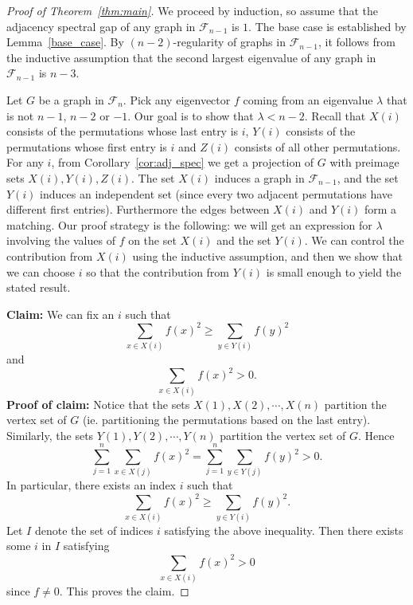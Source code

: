 \begin{proof}[Proof of Theorem~\ref{thm:main}]
  We proceed by induction,
  so assume that the adjacency spectral gap of any graph in $\mathcal{F}_{n-1}$ is $1$.  
  The base case is established by Lemma~\ref{base_case}.  By $(n-2)$-regularity of graphs
  in $\mathcal{F}_{n-1}$, it follows from the inductive assumption that the second largest
  eigenvalue of any graph in $\mathcal{F}_{n-1}$ is $n-3$.


  Let $G$ be a graph in $\mathcal{F}_{n}$.
  Pick any eigenvector $f$ coming from an eigenvalue $\lambda$ that is not
  $n-1$, $n-2$ or $-1$.  Our goal is to show that $\lambda < n-2$.
  Recall that $X(i)$ consists of the permutations whose 
  last entry is $i$, $Y(i)$ consists of the permutations whose first entry is
  $i$ and $Z(i)$ consists of all other permutations.  For any $i$, from 
  Corollary~\ref{cor:adj_spec}
  we get a projection of $G$ with preimage sets 
  $X(i), Y(i), Z(i)$.
  The set $X(i)$ induces a graph in $\mathcal{F}_{n-1}$, and the set $Y(i)$
  induces an independent set (since every two adjacent permutations have
  different first entries).
  Furthermore the edges between $X(i)$ and 
  $Y(i)$ form a matching.  Our proof strategy is the following:  we will
  get an expression for $\lambda$ involving the values of $f$ on the 
  set $X(i)$ and the set $Y(i)$.  We can control the contribution from 
  $X(i)$ using the inductive assumption, and then we show that we can
  choose $i$ so that the contribution from $Y(i)$ is small enough
  to yield the stated result.
  
  
  \vspace*{1mm}
  \noindent \textbf{Claim:} We can fix an $i$ such that 
   \begin{equation}\label{eqn:gap_max}
     \sum_{x \in X(i)} f(x)^2 \geq \sum_{y \in Y(i)} f(y)^2
   \end{equation}
   and 
   \[ \sum_{x \in X(i)} f(x)^2 > 0. \]
   \textbf{Proof of claim:} Notice that the sets $X(1), X(2), \cdots, X(n)$
  partition the vertex set of $G$ (ie.  partitioning the permutations
  based on the last entry).  Similarly, the sets 
  $Y(1), Y(2), \cdots, Y(n)$ partition the vertex set of $G$.
  Hence
   \[ \sum_{j=1}^n \sum_{x \in X(j)} f(x)^2 = \sum_{j=1}^n \sum_{y \in Y(j)} f(y)^2 >0 . \]
  In particular, there exists an index $i$ such that 
   \begin{equation*}
     \sum_{x \in X(i)} f(x)^2 \geq \sum_{y \in Y(i)} f(y)^2.
   \end{equation*}
Let $I$  denote the set of indices $i$ satisfying the above inequality. Then there exists some $i$ in $I$ satisfying
   \begin{equation*}
     \sum_{x \in X(i)} f(x)^2 > 0
   \end{equation*}
  since $f \not = 0$. This proves the claim.
  

\end{proof}
